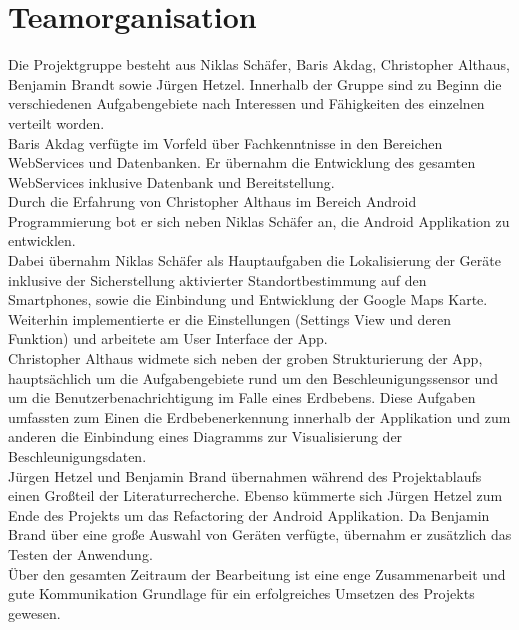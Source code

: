 \section{Teamorganisation}
Die Projektgruppe besteht aus Niklas Schäfer, Baris Akdag, Christopher Althaus, Benjamin Brandt sowie Jürgen Hetzel. Innerhalb der Gruppe sind zu Beginn die verschiedenen Aufgabengebiete nach Interessen und Fähigkeiten des einzelnen verteilt worden.\\
Baris Akdag verfügte im Vorfeld über Fachkenntnisse in den Bereichen WebServices und Datenbanken. Er übernahm die Entwicklung des gesamten WebServices inklusive Datenbank und Bereitstellung.\\
Durch die Erfahrung von Christopher Althaus im Bereich Android Programmierung bot er sich neben Niklas Schäfer an, die Android Applikation zu entwicklen.\\
Dabei übernahm Niklas Schäfer als Hauptaufgaben die Lokalisierung der Geräte inklusive der Sicherstellung aktivierter Standortbestimmung auf den Smartphones, sowie die Einbindung und Entwicklung der Google Maps Karte. Weiterhin implementierte er die Einstellungen (Settings View und deren Funktion) und arbeitete am User Interface der App.\\ 
Christopher Althaus widmete sich neben der groben Strukturierung der App, hauptsächlich um die Aufgabengebiete rund um den Beschleunigungssensor und um die Benutzerbenachrichtigung im Falle eines Erdbebens. Diese Aufgaben umfassten zum Einen die Erdbebenerkennung innerhalb der Applikation und zum anderen die Einbindung eines Diagramms zur Visualisierung der Beschleunigungsdaten.\\
Jürgen Hetzel und Benjamin Brand übernahmen während des Projektablaufs einen Großteil der Literaturrecherche. Ebenso kümmerte sich Jürgen Hetzel zum Ende des Projekts um das Refactoring der Android Applikation.
Da Benjamin Brand über eine große Auswahl von Geräten verfügte, übernahm er zusätzlich das Testen der Anwendung.\\
Über den gesamten Zeitraum der Bearbeitung ist eine enge Zusammenarbeit und gute Kommunikation Grundlage für ein erfolgreiches Umsetzen des Projekts gewesen.
\newpage